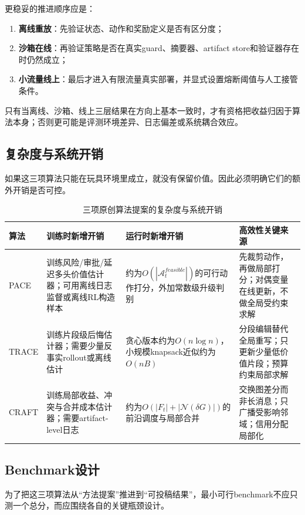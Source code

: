 \documentclass[12pt,a4paper]{article}
\begin{document}
更稳妥的推进顺序应是：
\begin{enumerate}
    \item \textbf{离线重放}：先验证状态、动作和奖励定义是否有区分度；
    \item \textbf{沙箱在线}：再验证策略是否在真实guard、摘要器、artifact store和验证器存在时仍然成立；
    \item \textbf{小流量线上}：最后才进入有限流量真实部署，并显式设置熔断阈值与人工接管条件。
\end{enumerate}

只有当离线、沙箱、线上三层结果在方向上基本一致时，才有资格把收益归因于算法本身；否则更可能是评测环境差异、日志偏差或系统耦合效应。

\subsection{复杂度与系统开销}

如果这三项算法只能在玩具环境里成立，就没有保留价值。因此必须明确它们的额外开销是否可控。

\begin{table}[H]
\centering
\small
\caption{三项原创算法提案的复杂度与系统开销}
\begin{tabular}{p{1.9cm}p{3.7cm}p{3.5cm}p{3.5cm}}
\toprule
\textbf{算法} & \textbf{训练时新增开销} & \textbf{运行时新增开销} & \textbf{高效性关键来源} \\
\midrule
PACE & 训练风险/审批/延迟多头价值估计器；可用离线日志监督或离线RL构造样本 & 约为$O(|\mathcal{A}_t^{feasible}|)$的可行动作打分，外加常数级升级判别 & 先裁剪动作，再做局部打分；对偶变量在线更新，不做全局受约束求解 \\
TRACE & 训练片段级后悔估计器；需要少量反事实rollout或离线估计 & 贪心版本约为$O(n \log n)$，小规模knapsack近似约为$O(nB)$ & 分段编辑替代全局重写；只更新少量低价值片段；预算约束局部求解 \\
CRAFT & 训练局部收益、冲突与合并成本估计器；需要artifact-level日志 & 约为$O(|F_t| + |\mathcal{N}(\delta G)|)$的前沿调度与局部合并 & 交换图差分而非长消息；只广播受影响邻域；信用分配局部化 \\
\bottomrule
\end{tabular}
\end{table}

\subsection{Benchmark设计}

为了把这三项算法从“方法提案”推进到“可投稿结果”，最小可行benchmark不应只测一个总分，而应围绕各自的关键瓶颈设计。
\end{document}

